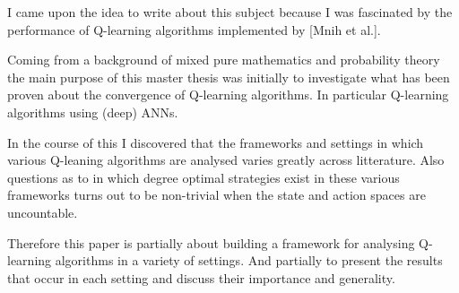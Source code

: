
I came upon the idea to write about this subject because 
I was fascinated by the performance of Q-learning algorithms
implemented by [Mnih et al.].

Coming from a background of mixed pure mathematics and 
probability theory the
main purpose of this master thesis was initially
to investigate what has been proven
about the convergence of Q-learning algorithms.
In particular Q-learning algorithms using (deep) ANNs.

In the course of this I discovered that the frameworks
and settings in which various Q-leaning algorithms are analysed
varies greatly across litterature.
Also questions as to in which degree optimal strategies
exist in these various frameworks turns out to be
non-trivial when the state and action spaces are uncountable.

Therefore this paper is partially about building a framework
for analysing Q-learning algorithms in a variety of settings.
And partially to present the results that occur in each setting
and discuss their importance and generality.
